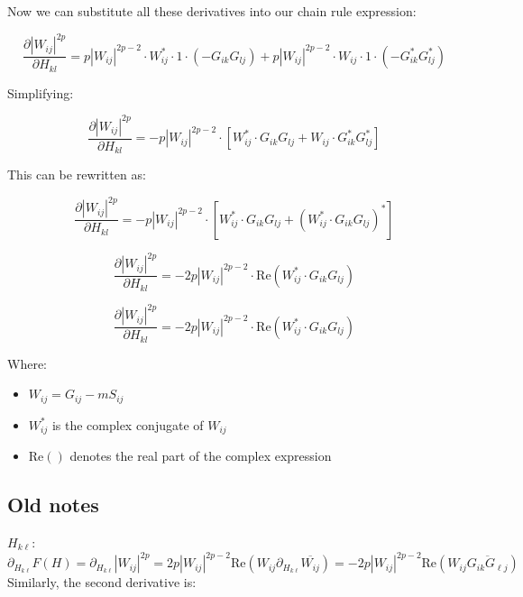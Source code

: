 \documentclass[11pt]{article}
\begin{document}
Now we can substitute all these derivatives into our chain rule expression:

$$\frac{\partial |W_{ij}|^{2p}}{\partial H_{kl}} = p|W_{ij}|^{2p-2} \cdot W_{ij}^* \cdot 1 \cdot (-G_{ik}G_{lj}) + p|W_{ij}|^{2p-2} \cdot W_{ij} \cdot 1 \cdot (-G_{ik}^*G_{lj}^*)$$

Simplifying:

$$\frac{\partial |W_{ij}|^{2p}}{\partial H_{kl}} = -p|W_{ij}|^{2p-2} \cdot [W_{ij}^* \cdot G_{ik}G_{lj} + W_{ij} \cdot G_{ik}^*G_{lj}^*]$$

This can be rewritten as:

$$\frac{\partial |W_{ij}|^{2p}}{\partial H_{kl}} = -p|W_{ij}|^{2p-2} \cdot [W_{ij}^* \cdot G_{ik}G_{lj} + (W_{ij}^* \cdot G_{ik}G_{lj})^*]$$

$$\frac{\partial |W_{ij}|^{2p}}{\partial H_{kl}} = -2p|W_{ij}|^{2p-2} \cdot \text{Re}(W_{ij}^* \cdot G_{ik}G_{lj})$$



$$\frac{\partial |W_{ij}|^{2p}}{\partial H_{kl}} = -2p|W_{ij}|^{2p-2} \cdot \text{Re}(W_{ij}^* \cdot G_{ik}G_{lj})$$

Where:
\begin{itemize}
    \item $W_{ij} = G_{ij} - mS_{ij}$
    \item $W_{ij}^*$ is the complex conjugate of $W_{ij}$
    \item $\text{Re}()$ denotes the real part of the complex expression
\end{itemize}

\subsection*{Old notes}

 $H_{k\ell}$: 
$$\partial_{H_{k\ell}}F(H) = \partial_{H_{k\ell}} |W_{ij}|^{2p} = 2p|W_{ij}|^{2p-2}\text{Re}\left(W_{ij}\partial_{H_{k\ell}}\overline{W_{ij}}\right)= -2p|W_{ij}|^{2p-2}\text{Re}\left(W_{ij}\overline{G_{ik}G_{\ell j}}\right)$$
Similarly, the second derivative is:
\end{document}

